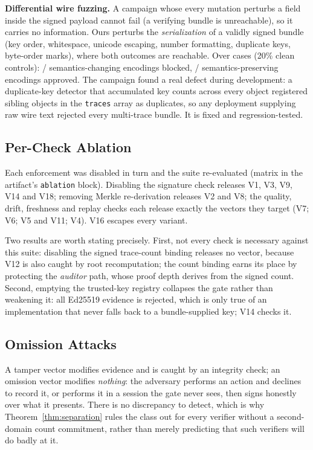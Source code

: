 \documentclass[letterpaper,10pt,twocolumn]{article}
\theoremstyle{definition}
\begin{document}
\textbf{Differential wire fuzzing.} A campaign whose every mutation perturbs a field inside the signed payload cannot fail (a verifying bundle is unreachable), so it carries no information. Ours perturbs the \emph{serialization} of a validly signed bundle (key order, whitespace, unicode escaping, number formatting, duplicate keys, byte-order marks), where both outcomes are reachable. Over \fuzzCases{} cases (20\% clean controls): \fuzzBlockedK/\fuzzBlockedN{} semantics-changing encodings blocked, \fuzzApprovedK/\fuzzApprovedN{} semantics-preserving encodings approved. The campaign found a real defect during development: a duplicate-key detector that accumulated key counts across every object registered sibling objects in the \texttt{traces} array as duplicates, so any deployment supplying raw wire text rejected every multi-trace bundle. It is fixed and regression-tested.

\subsection{Per-Check Ablation}
Each enforcement was disabled in turn and the suite re-evaluated (matrix in the artifact's \texttt{ablation} block). Disabling the signature check releases V1, V3, V9, V14 and V18; removing Merkle re-derivation releases V2 and V8; the quality, drift, freshness and replay checks each release exactly the vectors they target (V7; V6; V5 and V11; V4). V16 escapes every variant.

Two results are worth stating precisely. First, not every check is necessary against this suite: disabling the signed trace-count binding releases no vector, because V12 is also caught by root recomputation; the count binding earns its place by protecting the \emph{auditor} path, whose proof depth derives from the signed count. Second, emptying the trusted-key registry collapses the gate rather than weakening it: all Ed25519 evidence is rejected, which is only true of an implementation that never falls back to a bundle-supplied key; V14 checks it.

\subsection{Omission Attacks}\label{sec:omission}
A tamper vector modifies evidence and is caught by an integrity check; an omission vector modifies \emph{nothing}: the adversary performs an action and declines to record it, or performs it in a session the gate never sees, then signs honestly over what it presents. There is no discrepancy to detect, which is why Theorem~\ref{thm:separation} rules the class out for every verifier without a second-domain count commitment, rather than merely predicting that such verifiers will do badly at it.
\end{document}
